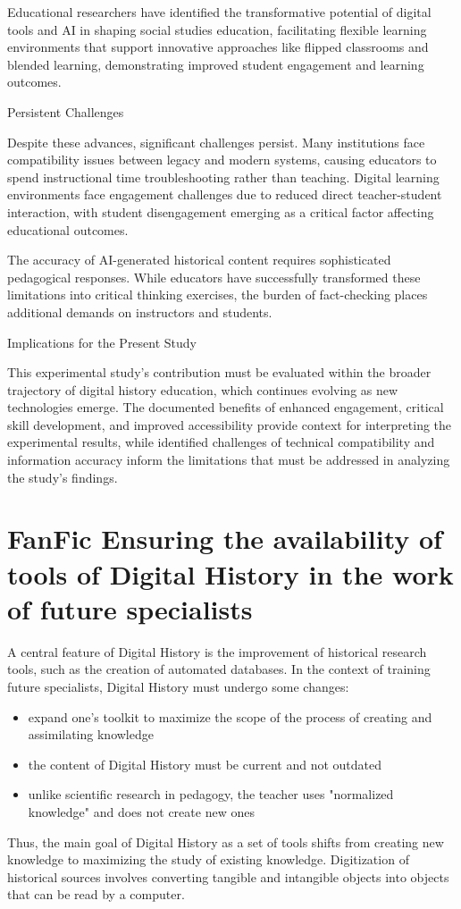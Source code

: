 Educational researchers have identified the transformative potential of digital tools and AI in shaping social studies education, facilitating flexible learning environments that support innovative approaches like flipped classrooms and blended learning, demonstrating improved student engagement and learning outcomes.

Persistent Challenges

Despite these advances, significant challenges persist. Many institutions face compatibility issues between legacy and modern systems, causing educators to spend instructional time troubleshooting rather than teaching. Digital learning environments face engagement challenges due to reduced direct teacher-student interaction, with student disengagement emerging as a critical factor affecting educational outcomes.

The accuracy of AI-generated historical content requires sophisticated pedagogical responses. While educators have successfully transformed these limitations into critical thinking exercises, the burden of fact-checking places additional demands on instructors and students.

Implications for the Present Study

This experimental study's contribution must be evaluated within the broader trajectory of digital history education, which continues evolving as new technologies emerge. The documented benefits of enhanced engagement, critical skill development, and improved accessibility provide context for interpreting the experimental results, while identified challenges of technical compatibility and information accuracy inform the limitations that must be addressed in analyzing the study's findings.


\section{FanFic Ensuring the availability of tools of Digital History in the work of future specialists}

A central feature of Digital History is the improvement of historical research tools, such as the creation of automated databases. In the context of training future specialists, Digital History must undergo some changes:
\begin{itemize}
    \item expand one's toolkit to maximize the scope of the process of creating and assimilating knowledge
    \item the content of Digital History must be current and not outdated
    \item unlike scientific research in pedagogy, the teacher uses "normalized knowledge" and does not create new ones
\end{itemize}
Thus, the main goal of Digital History as a set of tools shifts from creating new knowledge to maximizing the study of existing knowledge.
Digitization of historical sources involves converting tangible and intangible objects into objects that can be read by a computer. 



